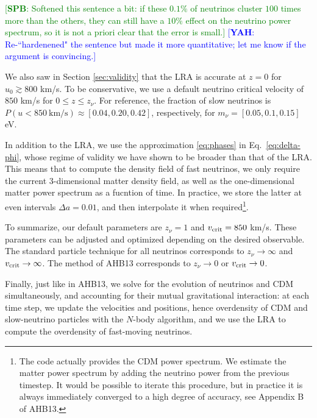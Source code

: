 \documentclass[useAMS, usenatbib]{mnras}
\newcommand{\spb}[1]{{\textcolor{green}{[{\bf SPB}: #1]}}}
\newcommand{\yah}[1]{{\textcolor{blue}{[{\bf YAH}: #1]}}}
\begin{document}
\spb{Softened this sentence a bit: if these $0.1\%$ of neutrinos cluster $100$ times more than the others, they can still have a $10\%$ effect on the neutrino power spectrum, so it is not a priori clear that the error is small.} \yah{Re-``hardenened" the sentence but made it more quantitative; let me know if the argument is convincing.}

We also saw in Section \ref{sec:validity} that the LRA is accurate at $z = 0$ for $u_0 \gtrsim 800$ km/s. To be conservative, we use a default neutrino critical velocity of $850$ km/s for $0 \leq z \leq z_\nu$. For reference, the fraction of slow neutrinos is $P(u < 850 ~\textrm{km/s}) \approx [0.04, 0.20, 0.42]$, respectively, for  $m_{\nu} = [0.05, 0.1, 0.15]$ eV.

In addition to the LRA, we use the approximation \eqref{eq:phases} in Eq.~\eqref{eq:delta-phi}, whose regime of validity we have shown to be broader than that of the LRA. This means that to compute the density field of fast neutrinos, we only require the current 3-dimensional matter density field, as well as the one-dimensional matter power spectrum as a fucntion of time. In practice, we store the latter at even intervals $\Delta a = 0.01$, and then interpolate it when required\footnote{The code actually provides the CDM power spectrum. We estimate the matter power spectrum by adding the neutrino power from the previous timestep. It would be possible to iterate this procedure, but in practice it is always immediately converged to a high degree of accuracy, see Appendix B of AHB13.}.




To summarize, our default parameters are $z_\nu = 1$ and $v_{\rm crit} = 850$ km/s. These parameters can be adjusted and optimized depending on the desired observable. The standard particle technique for all neutrinos corresponds to $z_\nu \rightarrow \infty$ and $v_{\rm crit} \rightarrow \infty$. The method of AHB13 corresponds to $z_\nu \rightarrow 0$ or $v_{\rm crit} \rightarrow 0$.

Finally, just like in AHB13, we solve for the evolution of neutrinos and CDM simultaneously, and accounting for their mutual gravitational interaction: at each time step, we update the velocities and positions, hence overdensity of CDM and slow-neutrino particles with the $N$-body algorithm, and we use the LRA to compute the overdensity of fast-moving neutrinos.

\end{document}
